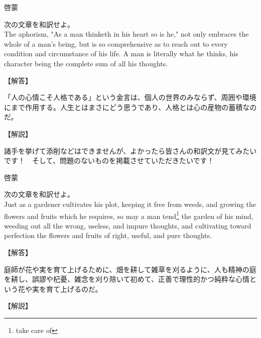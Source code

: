 \documentclass[b4paper,fleqn,dvipdfmx]{jsarticle}
\begin{document}
\newpage

\begin{itembox}[l]{啓蒙}

    次の文章を和訳せよ。\\
    The aphorism, "As a man thinketh in his heart so is he," not only embraces the whole of a man’s being, but is so comprehensive as to reach out to every condition and circumstance of his life. A man is literally what he thinks, his character being the complete sum of all his thoughts.
    
\end{itembox}


\begin{flushleft}
【解答】
\end{flushleft}

    「人の心情こそ人格である」という金言は、個人の世界のみならず、周囲や環境にまで作用する。人生とはまさにどう思うであり、人格とは心の産物の蓄積なのだ。

\begin{flushleft}
【解説】
\end{flushleft}

諸手を挙げて添削などはできませんが、よかったら皆さんの和訳文が見てみたいです！　そして、問題のないものを掲載させていただきたいです！



\newpage


\begin{itembox}[l]{啓蒙}

    次の文章を和訳せよ。\\
    Just as a gardener cultivates his plot, keeping it free from weeds, and growing the flowers and fruits which he requires, so may a man tend\footnote{take care of} the garden of his mind, weeding out all the wrong, useless, and impure thoughts, and cultivating toward perfection the flowers and fruits of right, useful, and pure thoughts.
    
\end{itembox}


\begin{flushleft}
【解答】
\end{flushleft}

庭師が花や実を育て上げるために、畑を耕して雑草を刈るように、人も精神の庭を耕し、誤謬や杞憂、雑念を刈り除いて初めて、正善で理性的かつ純粋な心情という花や実を育て上げるのだ。

\begin{flushleft}
【解説】
\end{flushleft}
\end{document}
